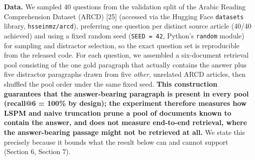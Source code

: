 \documentclass[pdflatex,sn-basic,Numbered]{sn-jnl}
\begin{document}
\textbf{Data.} We sampled 40 questions from the validation split of the Arabic Reading Comprehension Dataset (ARCD) [25] (accessed via the Hugging Face \texttt{datasets} library, \texttt{hsseinmz/arcd}), preferring one question per distinct source article (40/40 achieved) and using a fixed random seed (\texttt{SEED = 42}, Python's \texttt{random} module) for sampling and distractor selection, so the exact question set is reproducible from the released code. For each question, we assembled a six-document retrieval pool consisting of the one gold paragraph that actually contains the answer plus five distractor paragraphs drawn from five \textit{other}, unrelated ARCD articles, then shuffled the pool order under the same fixed seed. \textbf{This construction guarantees that the answer-bearing paragraph is present in every pool (recall@6 = 100\% by design); the experiment therefore measures how LSPM and naive truncation prune a pool of documents known to contain the answer, and does not measure end-to-end retrieval, where the answer-bearing passage might not be retrieved at all.} We state this precisely because it bounds what the result below can and cannot support (Section 6, Section 7).
\end{document}
